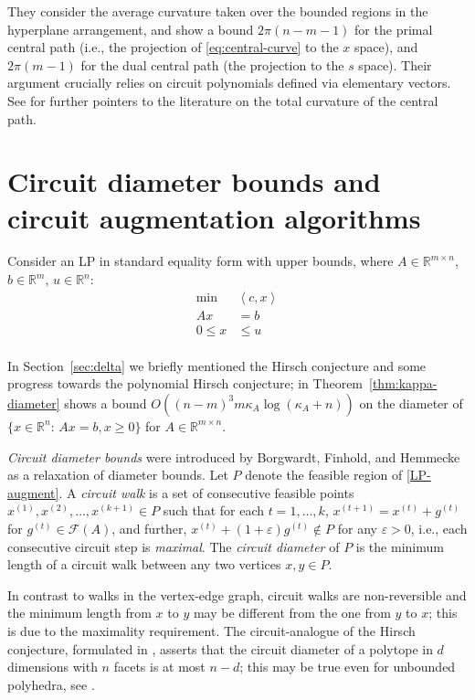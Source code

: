 \documentclass[11pt, a4paper]{article}
\newcommand{\Le}{\kappa}
\newcommand{\pr}[2]{\left\langle #1, #2 \right\rangle}
\newcommand{\1}{\mathbbm{1}}
\newcommand{\EE}{\mathcal F}
\theoremstyle{case}
\newcommand{\R}{\mathbb{R}}
\begin{document}
 They consider the average curvature taken over the bounded regions in the hyperplane arrangement, and show a bound $2\pi(n-m-1)$ for the primal central path (i.e., the projection of \eqref{eq:central-curve} to the $x$ space), and $2\pi(m-1)$ for the dual central path (the projection to the $s$ space). Their argument crucially relies on circuit polynomials defined via elementary vectors.
  See \cite{Loera2012} for further pointers to the literature on the total curvature of the central path. 

\section{Circuit diameter bounds and circuit augmentation algorithms}\label{sec:augment}
Consider an LP in standard equality form with upper  bounds, where $A\in \R^{m\times n}$, $b\in \R^m$, $u\in \R^n$:
\begin{equation}
\label{LP-augment}\tag{LP$(A,b,c,u)$}
\begin{aligned}
\min \; & \pr{c}{x} \\ 
Ax&=b \\
0\leq x&\leq u\,\\
\end{aligned}
\end{equation}

In Section~\ref{sec:delta} we briefly mentioned the Hirsch conj\-ecture and some progress towards the polynomial Hirsch conjecture; in Theorem~\ref{thm:kappa-diameter} shows a bound $O((n-m)^3m\Le_A\log(\Le_A+n))$ on the diameter of $\{x\in \R^n:\, Ax=b,x\ge 0\}$ for $A\in\R^{m\times n}$.

\emph{Circuit diameter bounds} were introduced by Borgwardt, Finhold, and Hemmecke~\cite{Borgwardt2015} as a relaxation of diameter bounds. Let $P$ denote the feasible region of \ref{LP-augment}.
A \emph{circuit walk} is a set of consecutive feasible points $x^{(1)},x^{(2)},\ldots,x^{(k+1)}\in P$ such that for each $t=1,\ldots,k$, $x^{(t+1)}=x^{(t)}+g^{(t)}$ for $g^{(t)}\in \EE(A)$, and further, 
$x^{(t)}+(1+\varepsilon) g^{(t)}\notin P$ for any $\varepsilon>0$, i.e., each consecutive circuit step is \emph{maximal}. The \emph{circuit diameter} of $P$ is the minimum length of a circuit walk between any two vertices $x,y\in P$. 

In contrast to walks in the vertex-edge graph, circuit walks are non-reversible and the minimum length from $x$ to $y$ may be different from the one from $y$ to $x$; this is due to the maximality requirement. The circuit-analogue of the Hirsch conjecture, formulated in \cite{Borgwardt2015}, asserts that the circuit diameter of a polytope in $d$ dimensions with $n$ facets is at most $n-d$; this  may be true even for unbounded polyhedra, see \cite{Borgwardt2018circuit}.
\end{document}
